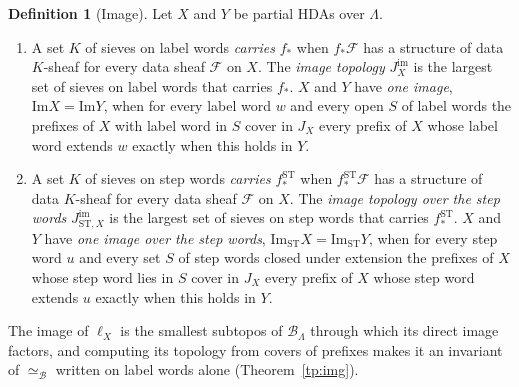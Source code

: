 \documentclass{lmcs}
\theoremstyle{definition}
\newtheorem{definition}[theorem]{Definition}
\theoremstyle{remark}
\newcommand{\JX}[1]{J_{#1}}
\providecommand{\BL}{\mathcal{B}_{\Lambda}}
\providecommand{\JimS}[1]{J^{\mathrm{im}}_{\mathrm{ST},#1}}
\providecommand{\eqB}{\simeq_{\mathcal{B}}}
\providecommand{\fsh}{f_{\ast}}
\providecommand{\Ima}{\mathrm{Im}}
\providecommand{\ImaST}{\mathrm{Im}_{\mathrm{ST}}}
\providecommand{\Jim}[1]{J^{\mathrm{im}}_{#1}}
\providecommand{\fshS}{f^{\mathrm{ST}}_{\ast}}
\begin{document}
\begin{definition}[Image]\label{def:image}\label{def:image-equiv}\label{def:image-st}
Let $X$ and $Y$ be partial HDAs over $\Lambda$.
\begin{enumerate}
\item A set $K$ of sieves on label words \emph{carries} $\fsh$ when $\fsh\mathscr{F}$ has a structure of data $K$-sheaf
  for every data sheaf $\mathscr{F}$ on $X$. The \emph{image topology} $\Jim{X}$ is the
  largest set of sieves on label words that carries $\fsh$. $X$ and $Y$ have \emph{one image},
  $\Ima X=\Ima Y$, when for every label word $w$ and every open $S$ of label words the prefixes
  of $X$ with label word in $S$ cover in $\JX{X}$ every prefix of $X$ whose label word extends $w$ exactly when this
  holds in $Y$.
\item A set $K$ of sieves on step words \emph{carries} $\fshS$ when $\fshS\mathscr{F}$ has a structure of data
  $K$-sheaf for every data sheaf $\mathscr{F}$ on $X$. The \emph{image topology over the
  step words} $\JimS{X}$ is the largest set of sieves on step words that carries $\fshS$. $X$
  and $Y$ have \emph{one image over the step words}, $\ImaST X=\ImaST Y$, when for every step word $u$ and every set
  $S$ of step words closed under extension the prefixes of $X$ whose step word lies in $S$ cover in $\JX{X}$ every
  prefix of $X$ whose step word extends $u$ exactly when this holds in $Y$.
\end{enumerate}
\end{definition}

The image of $\ell_X$ is the smallest subtopos of $\BL$ through which its direct image factors, and computing its
topology from covers of prefixes makes it an invariant of $\eqB$ written on label words alone
(Theorem~\ref{tp:img}).
\end{document}
